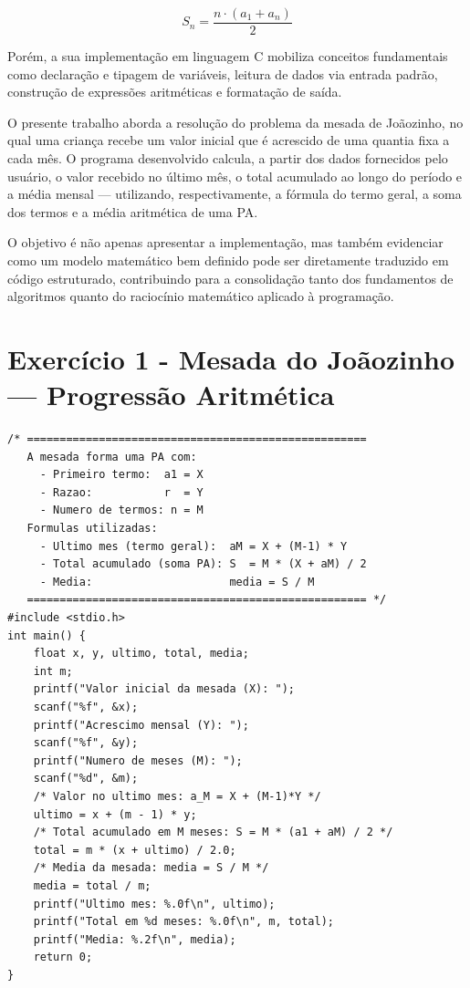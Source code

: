 \documentclass[12pt, a4paper]{article}
\begin{document}
\begin{equation}
  S_n = \frac{n \cdot (a_1 + a_n)}{2}
  \label{eq:soma-pa}
\end{equation}


Porém, a sua implementação em linguagem C mobiliza conceitos fundamentais como 
declaração e tipagem de variáveis, leitura de dados via entrada padrão, construção 
de expressões aritméticas e formatação de saída.


O presente trabalho aborda a resolução do problema da mesada de Joãozinho, no 
qual uma criança recebe um valor inicial que é acrescido de uma quantia fixa a 
cada mês. O programa desenvolvido calcula, a partir dos dados fornecidos pelo 
usuário, o valor recebido no último mês, o total acumulado ao longo do período 
e a média mensal — utilizando, respectivamente, a fórmula do termo geral, a soma 
dos termos e a média aritmética de uma PA.


O objetivo é não apenas apresentar a implementação, mas também evidenciar 
como um modelo matemático bem definido pode ser diretamente traduzido em código 
estruturado, contribuindo para a consolidação tanto dos fundamentos de algoritmos 
quanto do raciocínio matemático aplicado à programação.

\section*{Exercício 1 - Mesada do Joãozinho — Progressão Aritmética}



\begin{lstlisting}[style=cstyle, caption={Mesada do Joãozinho — Progressão 
    Aritmética}, label={lst:q2}]
/* ====================================================
   A mesada forma uma PA com:
     - Primeiro termo:  a1 = X
     - Razao:           r  = Y
     - Numero de termos: n = M
   Formulas utilizadas:
     - Ultimo mes (termo geral):  aM = X + (M-1) * Y
     - Total acumulado (soma PA): S  = M * (X + aM) / 2
     - Media:                     media = S / M
   ==================================================== */
#include <stdio.h>
int main() {
    float x, y, ultimo, total, media;
    int m;
    printf("Valor inicial da mesada (X): ");
    scanf("%f", &x);
    printf("Acrescimo mensal (Y): ");
    scanf("%f", &y);
    printf("Numero de meses (M): ");
    scanf("%d", &m);
    /* Valor no ultimo mes: a_M = X + (M-1)*Y */
    ultimo = x + (m - 1) * y;
    /* Total acumulado em M meses: S = M * (a1 + aM) / 2 */
    total = m * (x + ultimo) / 2.0;
    /* Media da mesada: media = S / M */
    media = total / m;
    printf("Ultimo mes: %.0f\n", ultimo);
    printf("Total em %d meses: %.0f\n", m, total);
    printf("Media: %.2f\n", media);
    return 0;
}
\end{lstlisting}
\end{document}
